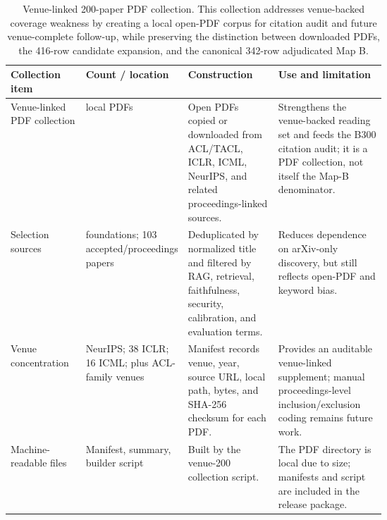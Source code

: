 \documentclass[11pt]{article}
\begin{document}

\begin{table}[t]
\centering
\scriptsize
\renewcommand{\arraystretch}{0.9}
\begin{tabularx}{\linewidth}{>{\raggedright\arraybackslash}p{0.20\linewidth}>{\raggedright\arraybackslash}p{0.18\linewidth}>{\raggedright\arraybackslash}p{0.24\linewidth}X}
\toprule
\textbf{Collection item} & \textbf{Count / location} & \textbf{Construction} & \textbf{Use and limitation} \\
\midrule
Venue-linked PDF collection & 200 local PDFs & Open PDFs copied or downloaded from ACL/TACL, ICLR, ICML, NeurIPS, and related proceedings-linked sources. & Strengthens the venue-backed reading set and feeds the B300 citation audit; it is a PDF collection, not itself the Map-B denominator. \\
Selection sources & 97 foundations; 103 accepted/proceedings papers & Deduplicated by normalized title and filtered by RAG, retrieval, faithfulness, security, calibration, and evaluation terms. & Reduces dependence on arXiv-only discovery, but still reflects open-PDF and keyword bias. \\
Venue concentration & 49 NeurIPS; 38 ICLR; 16 ICML; plus ACL-family venues & Manifest records venue, year, source URL, local path, bytes, and SHA-256 checksum for each PDF. & Provides an auditable venue-linked supplement; manual proceedings-level inclusion/exclusion coding remains future work. \\
Machine-readable files & Manifest, summary, builder script & Built by the venue-200 collection script. & The PDF directory is local due to size; manifests and script are included in the release package. \\
\bottomrule
\end{tabularx}
\caption{Venue-linked 200-paper PDF collection. This collection addresses venue-backed coverage weakness by creating a local open-PDF corpus for citation audit and future venue-complete follow-up, while preserving the distinction between downloaded PDFs, the 416-row candidate expansion, and the canonical 342-row adjudicated Map B.}
\label{tab:venue-200-collection}
\end{table}

\end{document}
